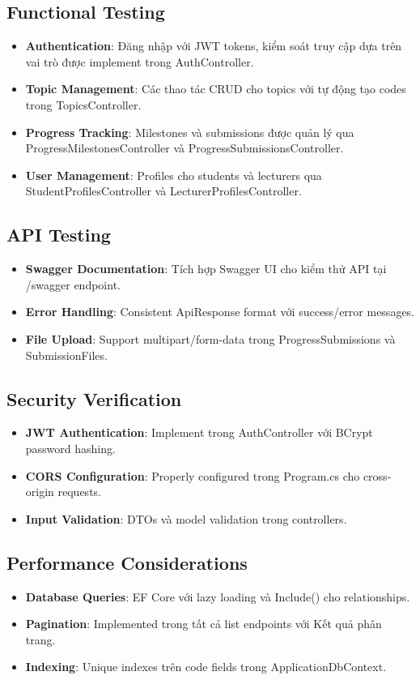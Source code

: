 \documentclass[conference,a4paper]{IEEEtran}
\begin{document}
\subsection{Functional Testing}
\begin{itemize}
  \item \textbf{Authentication}: Đăng nhập với JWT tokens, kiểm soát truy cập dựa trên vai trò được implement trong AuthController.
  \item \textbf{Topic Management}: Các thao tác CRUD cho topics với tự động tạo codes trong TopicsController.
  \item \textbf{Progress Tracking}: Milestones và submissions được quản lý qua ProgressMilestonesController và ProgressSubmissionsController.
  \item \textbf{User Management}: Profiles cho students và lecturers qua StudentProfilesController và LecturerProfilesController.
\end{itemize}

\subsection{API Testing}
\begin{itemize}
  \item \textbf{Swagger Documentation}: Tích hợp Swagger UI cho kiểm thử API tại /swagger endpoint.
  \item \textbf{Error Handling}: Consistent ApiResponse format với success/error messages.
  \item \textbf{File Upload}: Support multipart/form-data trong ProgressSubmissions và SubmissionFiles.
\end{itemize}

\subsection{Security Verification}
\begin{itemize}
  \item \textbf{JWT Authentication}: Implement trong AuthController với BCrypt password hashing.
  \item \textbf{CORS Configuration}: Properly configured trong Program.cs cho cross-origin requests.
  \item \textbf{Input Validation}: DTOs và model validation trong controllers.
\end{itemize}

\subsection{Performance Considerations}
\begin{itemize}
  \item \textbf{Database Queries}: EF Core với lazy loading và Include() cho relationships.
  \item \textbf{Pagination}: Implemented trong tất cả list endpoints với Kết quả phân trang.
  \item \textbf{Indexing}: Unique indexes trên code fields trong ApplicationDbContext.
\end{itemize}
\end{document}
